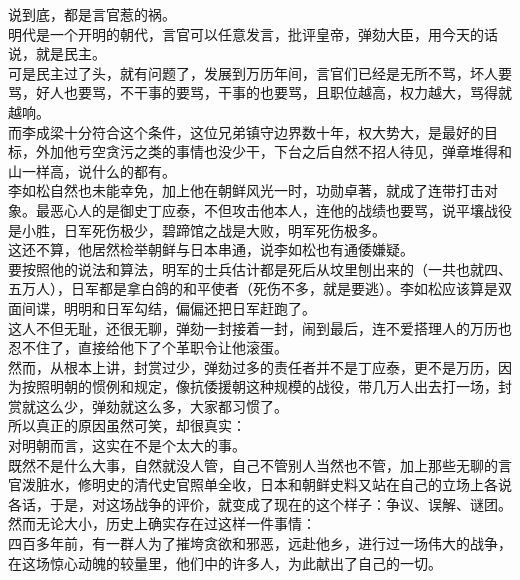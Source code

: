 \begin{multicols}{\theparacolNo}
说到底，都是言官惹的祸。\\

明代是一个开明的朝代，言官可以任意发言，批评皇帝，弹劾大臣，用今天的话说，就是民主。\\

可是民主过了头，就有问题了，发展到万历年间，言官们已经是无所不骂，坏人要骂，好人也要骂，不干事的要骂，干事的也要骂，且职位越高，权力越大，骂得就越响。\\

而李成梁十分符合这个条件，这位兄弟镇守边界数十年，权大势大，是最好的目标，外加他亏空贪污之类的事情也没少干，下台之后自然不招人待见，弹章堆得和山一样高，说什么的都有。\\

李如松自然也未能幸免，加上他在朝鲜风光一时，功勋卓著，就成了连带打击对象。最恶心人的是御史丁应泰，不但攻击他本人，连他的战绩也要骂，说平壤战役是小胜，日军死伤极少，碧蹄馆之战是大败，明军死伤极多。\\

这还不算，他居然检举朝鲜与日本串通，说李如松也有通倭嫌疑。\\

要按照他的说法和算法，明军的士兵估计都是死后从坟里刨出来的（一共也就四、五万人），日军都是拿白鸽的和平使者（死伤不多，就是要逃）。李如松应该算是双面间谍，明明和日军勾结，偏偏还把日军赶跑了。\\

这人不但无耻，还很无聊，弹劾一封接着一封，闹到最后，连不爱搭理人的万历也忍不住了，直接给他下了个革职令让他滚蛋。\\

然而，从根本上讲，封赏过少，弹劾过多的责任者并不是丁应泰，更不是万历，因为按照明朝的惯例和规定，像抗倭援朝这种规模的战役，带几万人出去打一场，封赏就这么少，弹劾就这么多，大家都习惯了。\\

所以真正的原因虽然可笑，却很真实：\\

对明朝而言，这实在不是个太大的事。\\

既然不是什么大事，自然就没人管，自己不管别人当然也不管，加上那些无聊的言官泼脏水，修明史的清代史官照单全收，日本和朝鲜史料又站在自己的立场上各说各话，于是，对这场战争的评价，就变成了现在的这个样子：争议、误解、谜团。\\

然而无论大小，历史上确实存在过这样一件事情：\\

四百多年前，有一群人为了摧垮贪欲和邪恶，远赴他乡，进行过一场伟大的战争，在这场惊心动魄的较量里，他们中的许多人，为此献出了自己的一切。\\


\end{multicols}
